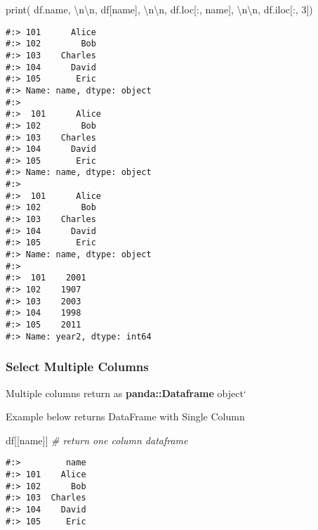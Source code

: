 \documentclass[
]{book}
\newenvironment{Shaded}{\begin{snugshade}}{\end{snugshade}}
\newcommand{\BuiltInTok}[1]{#1}
\newcommand{\CharTok}[1]{\textcolor[rgb]{0.5,0.5,0.5}{#1}}
\newcommand{\CommentTok}[1]{\textcolor[rgb]{0.37,0.37,0.37}{\textit{#1}}}
\newcommand{\DecValTok}[1]{\textcolor[rgb]{0.06,0.06,0.06}{#1}}
\newcommand{\NormalTok}[1]{#1}
\newcommand{\StringTok}[1]{\textcolor[rgb]{0.5,0.5,0.5}{#1}}
\begin{document}
\begin{Shaded}
\begin{Highlighting}[]
\BuiltInTok{print}\NormalTok{( }
\NormalTok{  df.name,           }\StringTok{\textquotesingle{}}\CharTok{\textbackslash{}n\textbackslash{}n}\StringTok{\textquotesingle{}}\NormalTok{,}
\NormalTok{  df[}\StringTok{\textquotesingle{}name\textquotesingle{}}\NormalTok{],        }\StringTok{\textquotesingle{}}\CharTok{\textbackslash{}n\textbackslash{}n}\StringTok{\textquotesingle{}}\NormalTok{,}
\NormalTok{  df.loc[:, }\StringTok{\textquotesingle{}name\textquotesingle{}}\NormalTok{], }\StringTok{\textquotesingle{}}\CharTok{\textbackslash{}n\textbackslash{}n}\StringTok{\textquotesingle{}}\NormalTok{,}
\NormalTok{  df.iloc[:, }\DecValTok{3}\NormalTok{])}
\end{Highlighting}
\end{Shaded}

\begin{verbatim}
#:> 101      Alice
#:> 102        Bob
#:> 103    Charles
#:> 104      David
#:> 105       Eric
#:> Name: name, dtype: object 
#:> 
#:>  101      Alice
#:> 102        Bob
#:> 103    Charles
#:> 104      David
#:> 105       Eric
#:> Name: name, dtype: object 
#:> 
#:>  101      Alice
#:> 102        Bob
#:> 103    Charles
#:> 104      David
#:> 105       Eric
#:> Name: name, dtype: object 
#:> 
#:>  101    2001
#:> 102    1907
#:> 103    2003
#:> 104    1998
#:> 105    2011
#:> Name: year2, dtype: int64
\end{verbatim}

\hypertarget{select-multiple-columns}{%
\subsubsection{Select Multiple Columns}\label{select-multiple-columns}}

Multiple columns return as \textbf{panda::Dataframe} object`

Example below returns DataFrame with Single Column

\begin{Shaded}
\begin{Highlighting}[]
\NormalTok{df[[}\StringTok{\textquotesingle{}name\textquotesingle{}}\NormalTok{]]  }\CommentTok{\# return one column dataframe}
\end{Highlighting}
\end{Shaded}

\begin{verbatim}
#:>         name
#:> 101    Alice
#:> 102      Bob
#:> 103  Charles
#:> 104    David
#:> 105     Eric
\end{verbatim}
\end{document}
